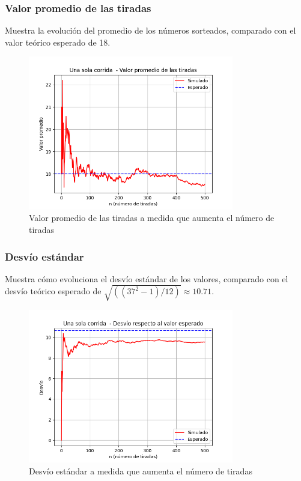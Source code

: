 \documentclass{article}
\begin{document}
\subsubsection{Valor promedio de las tiradas}
Muestra la evolución del promedio de los números sorteados, comparado con el valor teórico esperado de 18.
\begin{figure}
  \centering
  \includegraphics[width=0.8\textwidth]{grafica_promedio.png}
  \caption{Valor promedio de las tiradas a medida que aumenta el número de tiradas}
  \label{fig:promedio_individual}
\end{figure}

\subsubsection{Desvío estándar}
Muestra cómo evoluciona el desvío estándar de los valores, comparado con el desvío teórico esperado de $\sqrt{((37^2-1)/12)} \approx 10.71$.
\begin{figure}
  \centering
  \includegraphics[width=0.8\textwidth]{grafica_desvio.png}
  \caption{Desvío estándar a medida que aumenta el número de tiradas}
  \label{fig:desvio_individual}
\end{figure}
\end{document}
